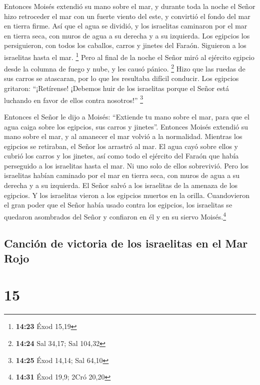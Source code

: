  Entonces Moisés extendió su mano sobre el mar, y durante
toda la noche el Señor hizo retroceder el mar con un fuerte viento del
este, y convirtió el fondo del mar en tierra firme. Así que el agua se
dividió,  y los israelitas caminaron por el mar en tierra
seca, con muros de agua a su derecha y a su izquierda. 
Los egipcios los persiguieron, con todos los caballos, carros y jinetes
del Faraón. Siguieron a los israelitas hasta el mar. \footnote{\textbf{14:23}
  Éxod 15,19}  Pero al final de la noche el Señor miró al
ejército egipcio desde la columna de fuego y nube, y les causó pánico.
\footnote{\textbf{14:24} Sal 34,17; Sal 104,32}  Hizo que
las ruedas de sus carros se atascaran, por lo que les resultaba difícil
conducir. Los egipcios gritaron: ``¡Retírense! ¡Debemos huir de los
israelitas porque el Señor está luchando en favor de ellos contra
nosotros!'' \footnote{\textbf{14:25} Éxod 14,14; Sal 64,10}

 Entonces el Señor le dijo a Moisés: ``Extiende tu mano
sobre el mar, para que el agua caiga sobre los egipcios, sus carros y
jinetes''.  Entonces Moisés extendió su mano sobre el
mar, y al amanecer el mar volvió a la normalidad. Mientras los egipcios
se retiraban, el Señor los arrastró al mar.  El agua cayó
sobre ellos y cubrió los carros y los jinetes, así como todo el ejército
del Faraón que había perseguido a los israelitas hasta el mar. Ni uno
solo de ellos sobrevivió.  Pero los israelitas habían
caminado por el mar en tierra seca, con muros de agua a su derecha y a
su izquierda.  El Señor salvó a los israelitas de la
amenaza de los egipcios. Y los israelitas vieron a los egipcios muertos
en la orilla.  Cuandovieron el gran poder que el Señor
había usado contra los egipcios, los israelitas se quedaron asombrados
del Señor y confiaron en él y en su siervo Moisés.\footnote{\textbf{14:31}
  Éxod 19,9; 2Cró 20,20}

\hypertarget{canciuxf3n-de-victoria-de-los-israelitas-en-el-mar-rojo}{%
\subsection{Canción de victoria de los israelitas en el Mar
Rojo}\label{canciuxf3n-de-victoria-de-los-israelitas-en-el-mar-rojo}}

\hypertarget{section-14}{%
\section{15}\label{section-14}}

